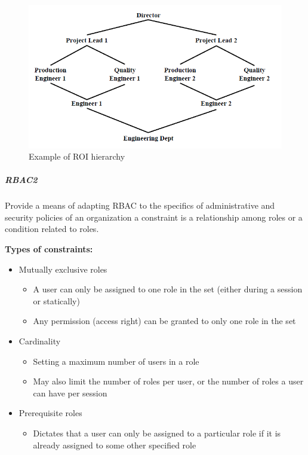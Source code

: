 \documentclass{article}
\begin{document}
            \begin{figure}[h]
                \begin{center}
                    \includegraphics[scale=0.6]{../immagini/RBAC1.png}
                \end{center}
                \caption{Example of ROI
                hierarchy}
            \end{figure}

        \subparagraph{RBAC2}
        Provide a means of adapting RBAC to the specifics of
        administrative and security policies of an organization a constraint is a relationship among roles or a condition
        related to roles.

        \textbf{Types of constraints:}\\
        \begin{itemize}
            \item Mutually exclusive roles
            \begin{itemize}
                \item A user can only be assigned to one role in the set (either during a session or statically)
                \item Any permission (access right) can be granted to only one role in the set
            \end{itemize}
            \item Cardinality
            \begin{itemize}
                \item Setting a maximum number of users in a role
                \item May also limit the number of roles per user, or the number of roles a user can have per session
            \end{itemize}
            \item Prerequisite roles
            \begin{itemize}
                \item Dictates that a user can only be assigned to a particular role if it is already assigned to some other specified role
            \end{itemize}
        \end{itemize}
    
\end{document}
